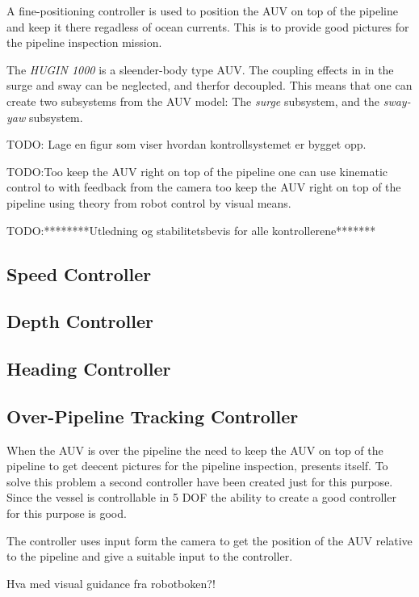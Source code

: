	A fine-positioning controller is used to position the AUV on top of the pipeline and keep it there regadless of ocean currents. This is to provide good pictures for the pipeline inspection mission.
	
	The \textit{HUGIN 1000} is a sleender-body type AUV. The coupling effects in in the surge and sway can be neglected, and therfor decoupled. This means that one can create two subsystems from the AUV model: The \textit{surge} subsystem, and the \textit{sway-yaw} subsystem. 
	
	TODO: Lage en figur som viser hvordan kontrollsystemet er bygget opp.
	
	TODO:Too keep the AUV right on top of the pipeline one can use kinematic control to with feedback from the camera too keep the AUV right on top of the pipeline using theory from robot control by visual means.
	
	
	TODO:********Utledning og stabilitetsbevis for alle kontrollerene*******
	\subsection{Speed Controller}
	
	
	
	\subsection{Depth Controller}

	
	
	\subsection{Heading Controller}
	
	
	\subsection{Over-Pipeline Tracking Controller}
		When the AUV is over the pipeline the need to keep the AUV on top of the pipeline to get deecent pictures for the pipeline inspection, presents itself. To solve this problem a second controller have been created just for this purpose. Since the vessel is controllable in 5 DOF the ability to create a good controller for this purpose is good. 
		
		The controller uses input form the camera to get the position of the AUV relative to the pipeline and give a suitable input to the controller.
		
		Hva med visual guidance fra robotboken?! 
		
